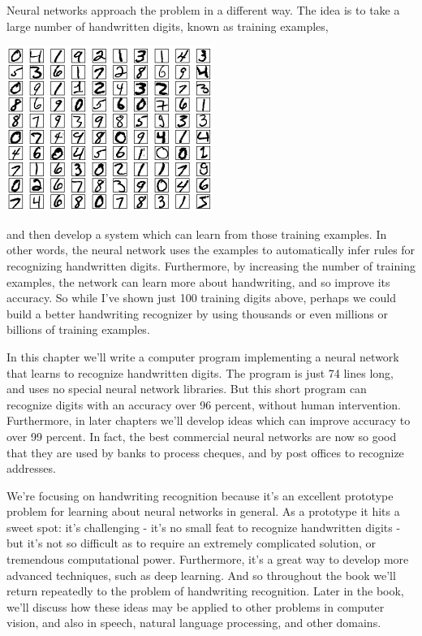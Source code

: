 \documentclass[a4paper,12pt]{report}%
\begin{document}
Neural networks approach the problem in a different way. The idea is to take a large number of handwritten digits, known as training examples,

\begin{center}
 \includegraphics[width=0.8\linewidth]{images/mnist_100_digits.png}
\end{center}

and then develop a system which can learn from those training examples. In other words, the neural network uses the examples to automatically infer rules for recognizing handwritten digits. Furthermore, by increasing the number of training examples, the network can learn more about handwriting, and so improve its accuracy. So while I've shown just 100 training digits above, perhaps we could build a better handwriting recognizer by using thousands or even millions or billions of training examples.

In this chapter we'll write a computer program implementing a neural network that learns to recognize handwritten digits. The program is just 74 lines long, and uses no special neural network libraries. But this short program can recognize digits with an accuracy over 96 percent, without human intervention. Furthermore, in later chapters we'll develop ideas which can improve accuracy to over 99 percent. In fact, the best commercial neural networks are now so good that they are used by banks to process cheques, and by post offices to recognize addresses.

We're focusing on handwriting recognition because it's an excellent prototype problem for learning about neural networks in general. As a prototype it hits a sweet spot: it's challenging - it's no small feat to recognize handwritten digits - but it's not so difficult as to require an extremely complicated solution, or tremendous computational power. Furthermore, it's a great way to develop more advanced techniques, such as deep learning. And so throughout the book we'll return repeatedly to the problem of handwriting recognition. Later in the book, we'll discuss how these ideas may be applied to other problems in computer vision, and also in speech, natural language processing, and other domains.
\end{document}

